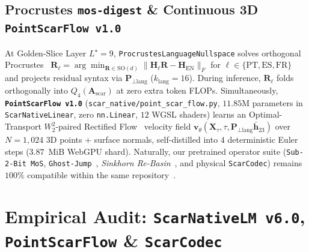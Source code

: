 \documentclass[10pt,twocolumn]{article}
\begin{document}
\subsection{Procrustes \texttt{mos-digest} \& Continuous 3D \texttt{PointScarFlow v1.0}}
At Golden-Slice Layer $L^\star=9$, \texttt{ProcrustesLanguageNullspace} solves orthogonal Procrustes~\citep{schonemann1966generalized} $\mathbf{R}_\ell = \arg\min_{\mathbf{R} \in \mathrm{SO}(d)} \|\mathbf{H}_\ell \mathbf{R} - \mathbf{H}_{\text{EN}}\|_F$ for $\ell \in \{\text{PT},\text{ES},\text{FR}\}$ and projects residual syntax via $\mathbf{P}_{\perp\text{lang}}$ ($k_{\text{lang}}=16$). During inference, $\mathbf{R}_\ell$ folds orthogonally into $Q_4(\mathbf{A}_{\text{scar}})$ at zero extra token FLOPs. Simultaneously, \textbf{\texttt{PointScarFlow v1.0}} (\texttt{scar\_native/point\_scar\_flow.py}, $11.85\text{M}$ parameters in \texttt{ScarNativeLinear}, zero \texttt{nn.Linear}, $12$ WGSL shaders) learns an Optimal-Transport $W_2^2$-paired Rectified Flow~\citep{lipman2023flow,liu2023flow} velocity field $\mathbf{v}_\theta(\mathbf{X}_\tau, \tau, \mathbf{P}_{\perp\text{lang}}\bar{\mathbf{h}}_{23})$ over $N=1{,}024$ 3D points + surface normals, self-distilled into $4$ deterministic Euler steps ($3.87$~MiB WebGPU shard). Naturally, our pretrained operator suite (\texttt{Sub-2-Bit MoS}, \texttt{Ghost-Jump}~\citep{leviathan2023fast}, \emph{Sinkhorn Re-Basin}~\citep{ainsworth2023git,sinkhorn1967concerning,marchenko1967distribution}, and physical \texttt{ScarCodec}) remains $100\%$ compatible within the same repository~\citep{reisfilho2026mos_zenodo,reisfilho2026qwen72b_mos_v2}.

\section{Empirical Audit: \texttt{ScarNativeLM v6.0}, \texttt{PointScarFlow} \& \texttt{ScarCodec}}
\end{document}
